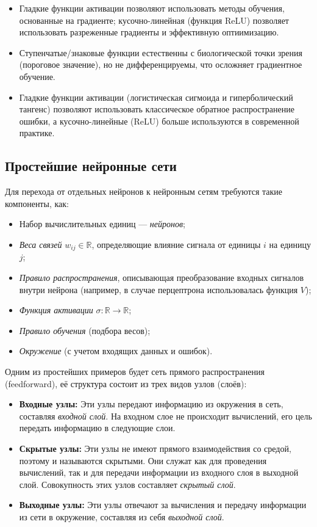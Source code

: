 \documentclass[../NDCNNAI_main.tex]{subfiles}
\begin{document}
\begin{remarks} 
	\leavevmode	
	\begin{itemize}
	\item Гладкие функции активации позволяют использовать методы обучения, основанные на градиенте; кусочно-линейная (функция ReLU) позволяет использовать разреженные градиенты и эффективную оптиимизацию. 
	\item Ступенчатые/знаковые функции естественны с биологической точки зрения (пороговое значение), но не дифференцируемы, что осложняет градиентное обучение.
	\item Гладкие функции активации (логистическая сигмоида и гиперболический тангенс) позволяют использовать классическое обратное распространение ошибки, а кусочно-линейные (ReLU) больше используются в современной практике. 
	\end{itemize}
\end{remarks}
	
\subsection{Простейшие нейронные сети}
Для перехода от отдельных нейронов к нейронным сетям требуются такие компоненты, как:
\begin{itemize}
	\item Набор вычислительных единиц --- \emph{нейронов};
	\item \emph{Веса связей} $w_{ij} \in \mathbb{R}$, определяющие влияние сигнала от единицы $i$ на единицу $j$;
	\item \emph{Правило распространения}, описывающая преобразование входных сигналов внутри нейрона (например, в случае перцептрона использовалась функция $V$);
	\item \emph{Функция активации} $\sigma\colon \mathbb{R} \to \mathbb{R}$;
	\item \emph{Правило обучения} (подбора весов);
	\item \emph{Окружение} (с учетом входящих данных и ошибок).
\end{itemize}
Одним из простейших примеров будет сеть прямого распространения (feedforward), её структура состоит из трех видов узлов (слоёв):
\begin{itemize}
	\item \textbf{Входные узлы:} Эти узлы передают информацию из окружения в сеть, составляя \emph{входной слой}.
	На входном слое не происходит вычислений, его цель передать информацию в следующие слои. 
	\item \textbf{Скрытые узлы:} Эти узлы не имеют прямого взаимодействия со средой, поэтому и называются скрытыми.
	Они служат как для проведения вычислений, так и для передачи информации из входного слоя в выходной слой.
	Совокупность этих узлов составляет \emph{скрытый слой}.
	\item \textbf{Выходные узлы: } Эти узлы отвечают за вычисления и передачу информации из сети в окружение, составляя из себя \emph{выходной слой}.
\end{itemize}
\end{document}
